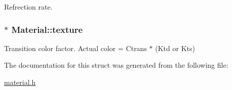 Refrection rate. 

\subsubsection[{\texorpdfstring{texture}{texture}}]{$\ast$ Material\+::texture}\hypertarget{structMaterial_ad151148dc3460f25435e951786171350}{}\label{structMaterial_ad151148dc3460f25435e951786171350}


Transition color factor. Actual color = Ctrans $\ast$ (Ktd or Kts) 



The documentation for this struct was generated from the following file\+:\begin{DoxyCompactItemize}
\item 
\hyperlink{material_8h}{material.\+h}\end{DoxyCompactItemize}
